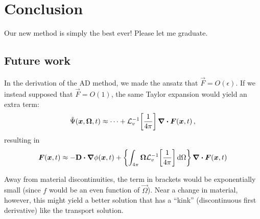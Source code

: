 
\chapter{Conclusion}

Our new method is simply the best ever! Please let me graduate.

\section{Future work}
In the derivation of the AD method, we made the ansatz that
$\vec{F}=O(\epsilon)$. If we instead supposed that $\vec{F}=O(1)$, the same
Taylor expansion would yield an extra term:
\begin{equation*}
  \tilde\Psi(\bm{x}, \bm{\Omega}, t)
  \approx \cdots + \mathcal{L}_{v}^{-1}\!\left[ \frac1{4\pi} \right] \bm{\nabla} \bm{\cdot} \bm{F}(\bm{x},t)\,,
\end{equation*}
resulting in
\begin{equation*}
  \bm{F}(\bm{x}, t)
  \approx - \mathbf{D} \bm{\cdot} \bm{\nabla} \phi(\bm{x},t)
  + \left\{ \int_{4\pi} \bm{\Omega} \mathcal{L}_{v}^{-1}\!\left[ \frac1{4\pi} \right] \mathop{}\!\mathrm{d}\Omega
  \right\} \bm{\nabla} \bm{\cdot} \bm{F}(\bm{x},t)
\end{equation*}

Away from material discontinuities, the term in brackets would be
exponentially small (since $f$ would be an even function of $\vec{\Omega}$).
Near a change in material, however, this might yield a better solution that has
a ``kink'' (discontinuous first derivative) like the transport solution.

